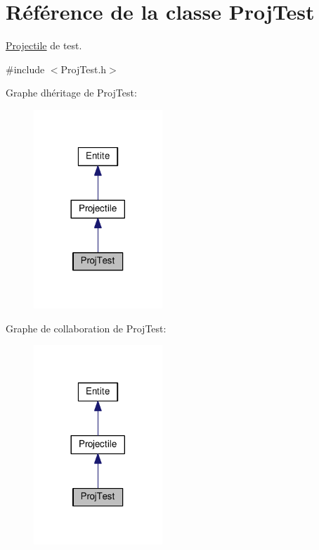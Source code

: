 \hypertarget{class_proj_test}{}\section{Référence de la classe Proj\+Test}
\label{class_proj_test}


\hyperlink{class_projectile}{Projectile} de test.  




{\ttfamily \#include $<$Proj\+Test.\+h$>$}



Graphe d\textquotesingle{}héritage de Proj\+Test\+:\nopagebreak
\begin{figure}[H]
\begin{center}
\leavevmode
\includegraphics[width=137pt]{class_proj_test__inherit__graph}
\end{center}
\end{figure}


Graphe de collaboration de Proj\+Test\+:\nopagebreak
\begin{figure}[H]
\begin{center}
\leavevmode
\includegraphics[width=137pt]{class_proj_test__coll__graph}
\end{center}
\end{figure}

